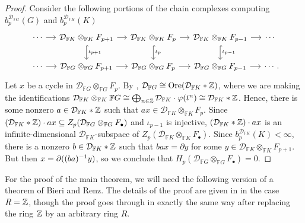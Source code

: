 \documentclass[11pt, letterpaper]{amsart}
\begin{document}
\begin{proof}
Consider the following portions of the chain complexes computing $b_p^{\mathcal{D}_{\mathbb{F}G}}(G)$ and $b_p^{\mathcal{D}_{\mathbb{F}K}}(K)$
\[
\begin{tikzcd}[column sep = small]
\cdots \arrow[r] & \mathcal{D}_{\mathbb{F}K} \otimes_{\mathbb{F}K} F_{p+1} \arrow[d, hook, "\iota_{p+1}"] \arrow[r] & \mathcal{D}_{\mathbb{F}K} \otimes_{\mathbb{F}K} F_p \arrow[d, hook, "\iota_p"] \arrow[r] & \mathcal{D}_{\mathbb{F}K} \otimes_{\mathbb{F}K} F_{p-1} \arrow[d, hook, "\iota_{p-1}"] \arrow[r] & \cdots \\
\cdots \arrow[r] & \mathcal{D}_{\mathbb{F}G} \otimes_{\mathbb{F}G} F_{p+1} \arrow[r]                               & \mathcal{D}_{\mathbb{F}G} \otimes_{\mathbb{F}G} F_p \arrow[r]                           & \mathcal{D}_{\mathbb{F}G} \otimes_{\mathbb{F}G} F_{p-1} \arrow[r]                                 & \cdots \nospacepunct{.}
\end{tikzcd}
\]
Let $x$ be a cycle in $\mathcal{D}_{\mathbb{F}G} \otimes_{\mathbb{F}G} F_p$. By \cite[Proposition 2.2(2)]{JaikinZapirain2020THEUO}, $\mathcal{D}_{\mathbb{F}G} \cong \mathrm{Ore}(\mathcal{D}_{\mathbb{F}K} * \mathbb{Z})$, where we are making the identifications $\mathcal{D}_{\mathbb{F}K} \otimes_{\mathbb{F}K} \mathbb{F}G \cong \bigoplus_{n \in \mathbb{Z}} \mathcal{D}_{\mathbb{F}K} \cdot \varphi(t^n) \cong \mathcal{D}_{\mathbb{F}K} * \mathbb{Z}$. Hence, there is some nonzero $a \in \mathcal{D}_{\mathbb{F}K} * \mathbb{Z}$ such that $ax \in \mathcal{D}_{\mathbb{F}K} \otimes_{\mathbb{F}K} F_p$. Since $(\mathcal{D}_{\mathbb{F}K} * \mathbb{Z}) \cdot ax \subseteq Z_p(\mathcal{D}_{\mathbb{F}G} \otimes_{\mathbb{F}G} F_\bullet)$ and $\iota_{p-1}$ is injective, $(\mathcal{D}_{\mathbb{F}K} * \mathbb{Z}) \cdot ax$ is an infinite-dimensional $\mathcal{D}_{\mathbb{F}K}$-subspace of $Z_p(\mathcal{D}_{\mathbb{F}K} \otimes_{\mathbb{F}K} F_\bullet)$. Since $b_p^{\mathcal{D}_{\mathbb{F}K}}(K) < \infty$, there is a nonzero $b \in \mathcal{D}_{\mathbb{F}K} * \mathbb{Z}$ such that $bax = \partial y$ for some $y \in \mathcal{D}_{\mathbb{F}K} \otimes_{\mathbb{F}K} F_{p+1}$. But then $x = \partial((ba)^{-1} y)$, so we conclude that $H_p(\mathcal{D}_{\mathbb{F}G} \otimes_{\mathbb{F}G} F_\bullet) = 0$. \qedhere
\end{proof}




For the proof of the main theorem, we will need the following version of a theorem of Bieri and Renz. The details of the proof are given in \cite[Theorem 5.1]{BieriRenzValutations} in the case $R = \mathbb{Z}$, though the proof goes through in exactly the same way after replacing the ring $\mathbb{Z}$ by an arbitrary ring $R$.
\end{document}
